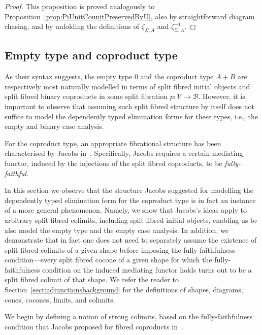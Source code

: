 \begin{proof}
This proposition is proved analogously to Proposition~\ref{prop:PiUnitCounitPreservedByU}, also by straightforward diagram chasing, and by unfolding the definitions of $\zeta_{\Sigma,A}$ and $\zeta_{\Sigma,A}^{-1}$.
\end{proof}


\subsection{Empty type and coproduct type}
\label{sect:fibadjmodelscolimits}

As their syntax suggests, the empty type $0$ and the coproduct type $A + B$ are respectively most naturally modelled in terms of split fibred initial objects and split fibred binary coproducts in some split fibration $p : \mathcal{V} \longrightarrow \mathcal{B}$. However, it is important to observe that assuming such split fibred structure by itself does not suffice to model the dependently typed elimination forms for these types, i.e., the empty and binary case analysis.

For the coproduct type, an appropriate fibrational structure has been characterised by Jacobs in~\cite[Exercise~10.5.6]{Jacobs:Book}. Specifically, Jacobs requires a certain mediating functor, induced by the injections of the split fibred coproducts, to be \emph{fully-faithful}.

In this section we observe that the structure Jacobs suggested for modelling the dependently typed  elimination form for the coproduct type is in fact an instance of a more general phenomenon. Namely, we show that Jacobs's ideas apply to arbitrary split fibred colimits, including split fibred initial objects, enabling us to also model the empty type and the empty case analysis. In addition, we demonstrate that in fact one does not need to separately assume the existence of split fibred colimits of a given shape before imposing the fully-faithfulness condition---every split fibred cocone of a given shape for which the fully-faithfulness condition on the induced mediating functor holds turns out to be a split fibred colimit of that shape. We refer the reader to Section~\ref{sect:adjunctionsbackground} for the definitions of shapes, diagrams, cones, cocones, limits, and colimits.

We begin by defining a notion of strong colimits, based on the fully-faithfulness condition that Jacobs proposed for fibred coproducts in~\cite[Exercise~10.5.6]{Jacobs:Book}.


